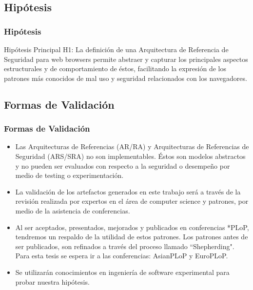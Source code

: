 \documentclass[serif,9pt]{beamer}
\begin{document}
\subsection{Hipótesis}
\begin{frame}
	\frametitle{Hipótesis}	
	\begin{block}{Hipótesis Principal}
			H1: La definición de una Arquitectura de Referencia de Seguridad para web browsers permite abstraer y capturar los principales aspectos estructurales y de comportamiento de éstos, facilitando la expresión de los patrones más conocidos de mal uso y seguridad relacionados con los navegadores.
	\end{block}
\end{frame}

\subsection{Formas de Validación}
\begin{frame}
	\frametitle{Formas de Validación}	
	\begin{itemize}
	\item Las Arquitecturas de Referencias (AR/RA) y Arquitecturas de Referencias de Seguridad (ARS/SRA) no son implementables. Éstos son modelos abstractos y no pueden ser evaluados con respecto a la seguridad o desempeño por medio de testing o experimentación.
	\item La validación de los artefactos generados en este trabajo será a través de la revisión realizada por expertos en el área de computer science y patrones, por medio de la asistencia de conferencias. 
	\item Al ser aceptados, presentados, mejorados y publicados en conferencias *PLoP, tendremos un respaldo de la utilidad de estos patrones. Los patrones antes de ser publicados, son refinados a través del proceso llamado ``Shepherding". Para esta tesis se espera ir a las conferencias: AsianPLoP y EuroPLoP.
	\item Se utilizarán conocimientos en ingeniería de software experimental para probar nuestra hipótesis. 
	\end{itemize}
\end{frame}
\end{document}
